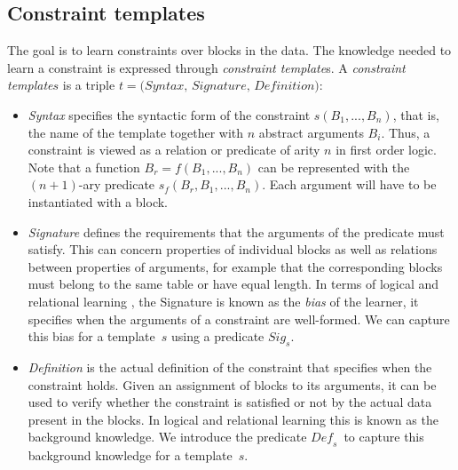 \documentclass{IEEEtran}
\newcommand{\format}[1]{\textit{#1}\xspace}
\newcommand{\template}{\format{constraint template}}
\newcommand{\CName}{Syntax\xspace}
\newcommand{\CSignature}{Signature\xspace}
\newcommand{\CFunction}{Definition\xspace}
\newcommand{\sbs}{B}
\newcommand{\sbl}[1]{\ensuremath{\sbs_{\textit{#1}}}}
\theoremstyle{definition}
\begin{document}
\newcommand{\sigc}{\ensuremath{\format{Sig}_s}}
\newcommand{\defc}{\ensuremath{\format{Def}_s}}

\subsection{Constraint templates}
The goal is to learn constraints over blocks in the data. The knowledge needed to learn a constraint is expressed through {\template}s.
%
A \template $s$ is a triple $t = \textit{(\CName, \CSignature, \CFunction)}$:
\begin{itemize}
\item
\textit{\CName}  specifies the syntactic form of the constraint $s(\sbl{1}, ...,\sbl{n})$, that is, the name of the template together
with $n$ abstract arguments $\sbl{i}$.
Thus, a constraint is viewed as a relation or predicate of arity $n$ in first order logic.
Note that a function $\sbl{r}=f(\sbl{1},...,\sbl{n})$ can be represented with the $(n{+}1)$-ary predicate $s_f(\sbl{r},\sbl{1},...,\sbl{n})$.
Each argument will have to be instantiated with a block.

\item \textit{\CSignature} defines the requirements that the arguments of the predicate must satisfy.
This can concern properties of individual blocks as well as relations between properties of arguments, for example that the corresponding blocks must belong to the same table or have equal length.
In terms of logical and relational learning \cite{luc_book}, the \CSignature is known as the {\em bias} of the learner, it specifies when the arguments of a constraint are well-formed.
We can capture this bias for a template~$s$ using a predicate $\sigc$.
\item \textit{\CFunction} is the actual definition of the constraint that specifies when the constraint holds.
Given an assignment of blocks to its arguments, it can be used to verify whether the constraint is satisfied or not by the actual data present in the blocks. %
In logical and relational learning this is known as the background knowledge.
We introduce the predicate \defc~to capture this background knowledge for a template~$s$.
\end{itemize}
\end{document}
